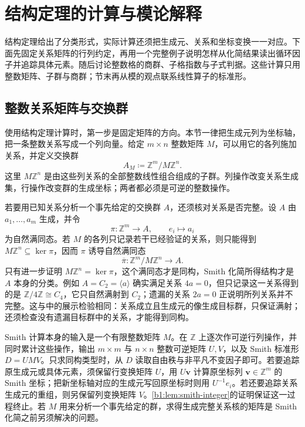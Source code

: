
\section{结构定理的计算与模论解释}
\label{b1:sec:0904}

结构定理给出了分类形式，实际计算还须把生成元、关系和坐标变换一一对应。下面先固定关系矩阵的行列约定，再用一个完整例子说明怎样从化简结果读出循环因子并追踪具体元素。随后讨论整数格的商群、子格指数与子式判据。这些计算只用整数矩阵、子群与商群；节末再从模的观点联系线性算子的标准形。

%
%
%

\subsection{整数关系矩阵与交换群}
\label{b1:subsec:0904:01}

使用结构定理计算时，第一步是固定矩阵的方向。本节一律把生成元列为坐标轴，把一条整数关系写成一个列向量。给定 \(m\times n\) 整数矩阵 \(M\)，可以用它的各列施加关系，并定义交换群
\[
	A_M\coloneqq\mathbb Z^m/M\mathbb Z^n.
\]
这里 \(M\mathbb Z^n\) 是由这些列关系的全部整数线性组合组成的子群。列操作改变关系生成集，行操作改变群的生成坐标；两者都必须是可逆的整数操作。

\ProseParagraphBreak
若要用已知关系分析一个事先给定的交换群 \(A\)，还须核对关系是否完整。设 \(A\) 由 \(a_1,\ldots,a_m\) 生成，并令
\[
	\pi:\mathbb Z^m\longrightarrow A, \qquad e_i\longmapsto a_i
\]
为自然满同态。若 \(M\) 的各列只记录若干已经验证的关系，则只能得到 \(M\mathbb Z^n\subseteq\ker\pi\)，因而 \(\pi\) 诱导自然满同态
\[
	\overline\pi:\mathbb Z^m/M\mathbb Z^n\longrightarrow A.
\]
只有进一步证明 \(M\mathbb Z^n=\ker\pi\)，这个满同态才是同构，Smith 化简所得结构才是 \(A\) 本身的分类。例如 \(A=C_2=\langle a\rangle\) 确实满足关系 \(4a=0\)，但只记录这一关系得到的是 \(\mathbb Z/4\mathbb Z\cong C_4\)，它只自然满射到 \(C_2\)；遗漏的关系 \(2a=0\) 正说明所列关系并不完整。这与中的展示检验相同：关系成立且生成元的像生成目标群，只保证满射；还须检查没有遗漏目标群中的关系，才能得到同构。

\ProseParagraphBreak
Smith 计算本身的输入是一个有限整数矩阵 \(M\)。在 \(\mathbb Z\) 上逐次作可逆行列操作，并同时累计这些操作，输出 \(m\times m\) 与 \(n\times n\) 整数可逆矩阵 \(U,V\)，以及 Smith 标准形 \(D=UMV\)。只求同构类型时，从 \(D\) 读取自由秩与非平凡不变因子即可。若要追踪原生成元或具体元素，须保留行变换矩阵 \(U\)，用 \(U\mathbf v\) 计算原坐标列 \(\mathbf v\in\mathbb Z^m\) 的 Smith 坐标；把新坐标轴对应的生成元写回原坐标时则用 \(U^{-1}e_i\)。若还要追踪关系生成元的重组，则另保留列变换矩阵 \(V\)。\cref{b1:lem:smith-integer}的证明保证这一过程终止。若 \(M\) 用来分析一个事先给定的群，求得生成完整关系核的矩阵是 Smith 化简之前另须解决的问题。

